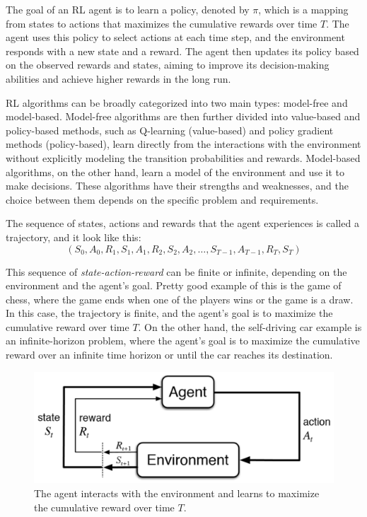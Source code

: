 \documentclass[../xlapes02]{subfiles}
\begin{document}
    The goal of an RL agent is to learn a policy, denoted by $\pi$, which is a mapping from states to actions that maximizes the cumulative rewards over time $T$. The agent uses this policy to select actions at each time step, and the environment responds with a new state and a reward. The agent then updates its policy based on the observed rewards and states, aiming to improve its decision-making abilities and achieve higher rewards in the long run.

    RL algorithms can be broadly categorized into two main types: model-free and model-based. Model-free algorithms are then further divided into value-based and policy-based methods, such as Q-learning (value-based) and policy gradient methods (policy-based), learn directly from the interactions with the environment without explicitly modeling the transition probabilities and rewards. Model-based algorithms, on the other hand, learn a model of the environment and use it to make decisions. These algorithms have their strengths and weaknesses, and the choice between them depends on the specific problem and requirements.

    The sequence of states, actions and rewards that the agent experiences is called a trajectory, and it look like this:
    \begin{equation}
        \label{eq:trajectory}
        (S_0, A_0, R_1, S_1, A_1, R_2, S_2, A_2, \dots, S_{T-1}, A_{T-1}, R_T, S_T)
    \end{equation}

    This sequence of \emph{state-action-reward} can be finite or infinite, depending on the environment and the agent's goal. Pretty good example of this is the game of chess, where the game ends when one of the players wins or the game is a draw. In this case, the trajectory is finite, and the agent's goal is to maximize the cumulative reward over time $T$. On the other hand, the self-driving car example is an infinite-horizon problem, where the agent's goal is to maximize the cumulative reward over an infinite time horizon or until the car reaches its destination.

    \begin{figure}[h]
        \includegraphics[width=0.6\linewidth]{image/agent-environment}
        \centering
        \caption{The agent interacts with the environment and learns to maximize the cumulative reward over time $T$.}
        \label{fig:rl-introduction}
    \end{figure}
\end{document}

